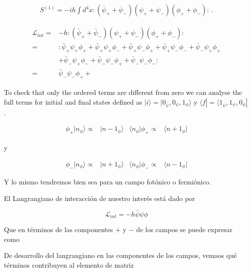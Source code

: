 \begin{align}
  S^{(1)}=-i h \int d^4x:(\overline{\psi}_++\overline{\psi}_-)(\psi_++\psi_-)(\phi_++\phi_-):\,.
\end{align}




\begin{align}
 \mathcal{L}_{int}=&-h:\left( \bar{\psi}_{+}+\bar{\psi}_{-}\right) \left( \psi_{+}+\psi_{-}\right) \left( \phi_{+}+\phi_{-}\right):\nonumber\\
=&:
\bar{\psi}_{+}\psi_{+}\phi_{+}+ 
\bar{\psi}_{+}\psi_{+}\phi_{-}+ 
\bar{\psi}_{+}\psi_{-}\phi_{+}+ 
\bar{\psi}_{+}\psi_{-}\phi_{-}+ 
\bar{\psi}_{-}\psi_{+}\phi_{+}\nonumber\\ 
&+\bar{\psi}_{-}\psi_{+}\phi_{-}+ 
\bar{\psi}_{-}\psi_{-}\phi_{+}+ 
\bar{\psi}_{-}\psi_{-}\phi_{-} 
:\nonumber\\
=&\bar{\psi}_{-}\psi_{-}\phi_{+}+ 
\end{align}


To check that only the ordered terms are different from zero we can analyse the full terms for initial and final states defined as $|i\rangle=|0_{\bar{\psi}},0_{\psi},1_{\phi}\rangle$ y $\langle f|=\langle 1_{\bar{\psi}},1_{\psi},0_\phi|$. 

\begin{align}
 \phi_{+} | n_{\phi} \rangle  \propto& |n-1_{\phi}\rangle & \langle n_{\phi}|\phi_{+} \propto& \langle n+1_{\phi}|
\end{align}

y

\begin{align}
 \phi_{-} |n_{\phi}\rangle  \propto& |n+1_{\phi}\rangle&  \langle n_{\phi}| \phi_{-} \propto& \langle n-1_{\phi}|
\end{align}

Y lo mismo tendremos bien sea para un campo fot\'onico o fermi\'onico.

El Langrangiano de interacci\'on de nuestro inter\'es est\'a dado por

\begin{equation}
 \mathcal{L}_{int}=-h\bar{\psi}\psi\phi
\end{equation}

Que en t\'erminos de las componentes $+$ y $-$ de los campos se puede expresar como


De desarrollo del langrangiano en las componentes de los campos, vemaos qu\'e t\'erminos contribuyen al elemento de matriz

